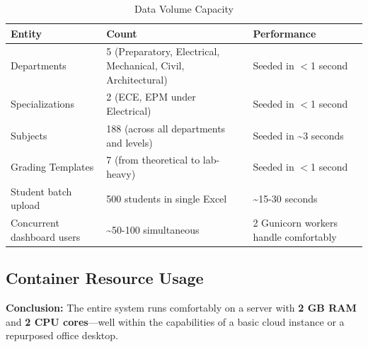 \begin{table}[H]
    \centering
    \renewcommand{\arraystretch}{1.3}
    \footnotesize
    \begin{tabular}{|p{2.8cm}|p{4.5cm}|p{3.7cm}|}
        \hline
        \textbf{Entity} & \textbf{Count} & \textbf{Performance} \\
        \hline
        Departments & 5 (Preparatory, Electrical, Mechanical, Civil, Architectural) & Seeded in $<$1 second \\
        \hline
        Specializations & 2 (ECE, EPM under Electrical) & Seeded in $<$1 second \\
        \hline
        Subjects & 188 (across all departments and levels) & Seeded in \textasciitilde3 seconds \\
        \hline
        Grading Templates & 7 (from theoretical to lab-heavy) & Seeded in $<$1 second \\
        \hline
        Student batch upload & 500 students in single Excel & \textasciitilde15-30 seconds \\
        \hline
        Concurrent dashboard users & \textasciitilde50-100 simultaneous & 2 Gunicorn workers handle comfortably \\
        \hline
    \end{tabular}
    \caption{Data Volume Capacity}
    \label{tab:data-volumes}
\end{table}

\subsection{Container Resource Usage}

\begin{table}[H]
    \centering
    \renewcommand{\arraystretch}{1.3}
    \caption{Container Resource Usage}
    \label{tab:container-resources}
\end{table}

\textbf{Conclusion:} The entire system runs comfortably on a server with \textbf{2 GB RAM} and \textbf{2 CPU cores}---well within the capabilities of a basic cloud instance or a repurposed office desktop.
